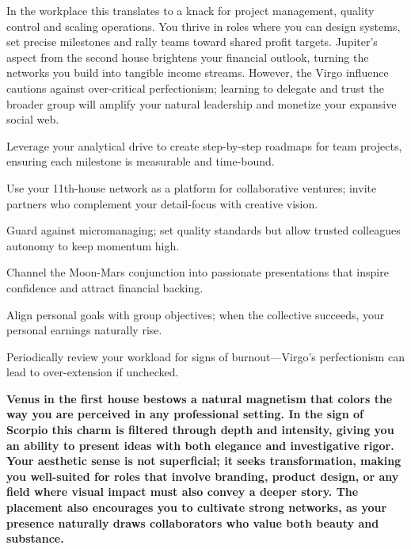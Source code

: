 {\fontsize{9}{13}\selectfont In the workplace this translates to a knack for project management, quality control and scaling operations. You thrive in roles where you can design systems, set precise milestones and rally teams toward shared profit targets. Jupiter's aspect from the second house brightens your financial outlook, turning the networks you build into tangible income streams. However, the Virgo influence cautions against over-critical perfectionism; learning to delegate and trust the broader group will amplify your natural leadership and monetize your expansive social web.}\par\vspace{1.8mm}

\begin{diamondlist}
  \item {\fontsize{8.5}{12}\selectfont Leverage your analytical drive to create step-by-step roadmaps for team projects, ensuring each milestone is measurable and time-bound.}
  \item {\fontsize{8.5}{12}\selectfont Use your 11th-house network as a platform for collaborative ventures; invite partners who complement your detail-focus with creative vision.}
  \item {\fontsize{8.5}{12}\selectfont Guard against micromanaging; set quality standards but allow trusted colleagues autonomy to keep momentum high.}
  \item {\fontsize{8.5}{12}\selectfont Channel the Moon-Mars conjunction into passionate presentations that inspire confidence and attract financial backing.}
  \item {\fontsize{8.5}{12}\selectfont Align personal goals with group objectives; when the collective succeeds, your personal earnings naturally rise.}
  \item {\fontsize{8.5}{12}\selectfont Periodically review your workload for signs of burnout---Virgo's perfectionism can lead to over-extension if unchecked.}
\end{diamondlist}


\label{topic9}

{\fontsize{9.5}{13.8}\selectfont\bfseries\color{DeepSlate} Venus in the first house bestows a natural magnetism that colors the way you are perceived in any professional setting. In the sign of Scorpio this charm is filtered through depth and intensity, giving you an ability to present ideas with both elegance and investigative rigor. Your aesthetic sense is not superficial; it seeks transformation, making you well-suited for roles that involve branding, product design, or any field where visual impact must also convey a deeper story. The placement also encourages you to cultivate strong networks, as your presence naturally draws collaborators who value both beauty and substance.}\par\vspace{2mm}

